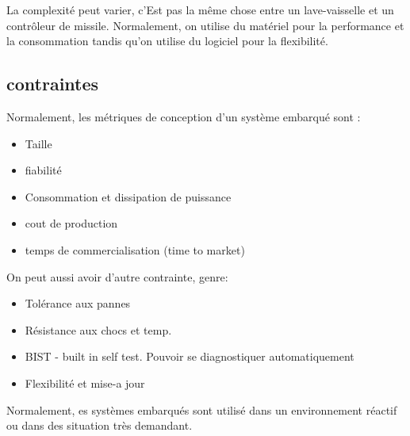 \documentclass[oneside]{book}
\begin{document}
    La complexité peut varier, c'Est pas la même chose entre un lave-vaisselle et un contrôleur de missile. Normalement, on utilise du matériel pour la performance et la consommation tandis qu'on utilise du logiciel pour la flexibilité.\\
    
    \subsection{contraintes}
    Normalement, les métriques de conception d'un système embarqué sont :
    \begin{itemize}
        \item Taille
        \item fiabilité
        \item Consommation et dissipation de puissance
        \item cout de production
        \item temps de commercialisation (time to market)
    \end{itemize}

    On peut aussi avoir d'autre contrainte, genre:
    \begin{itemize}
        \item Tolérance aux pannes
        \item Résistance aux chocs et temp.
        \item BIST - built in self test. Pouvoir se diagnostiquer automatiquement
        \item Flexibilité et mise-a jour
    \end{itemize}

    Normalement, es systèmes embarqués sont utilisé dans un environnement réactif ou dans des situation très demandant.
    
\end{document}
